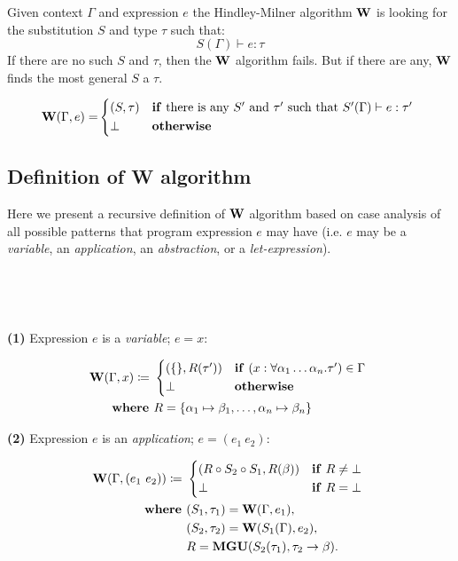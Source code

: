 \documentclass[a4paper,oneside]{memoir}
\begin{document}
Given context $\Gamma$ and expression $e$ the Hindley-Milner algorithm $\operatorname{\textbf{W}}$ 
is looking for the substitution $S$ and type $\tau$ such that: 
$$ S(\Gamma) \vdash e : \tau $$
If there are no such $S$ and $\tau$, then the $\operatorname{\textbf{W}}$ algorithm fails.
But if there are any, $\operatorname{\textbf{W}}$ finds the most general $S$ a $\tau$.


\begin{align*}
\W(\Gamma, e) = &
\begin{cases*}
  (S, \tau) 
  & \textbf{if} there is any $\SPr$ and $\tauPr$ such that $S^\prime(\Gamma) \vdash e : \tauPr$  \\
  \bot & \textbf{otherwise}
\end{cases*}\\
\end{align*}




\subsection{Definition of W algorithm}

Here we present a recursive definition of $\operatorname{\textbf{W}}$ algorithm based on case analysis of all possible patterns that program expression $e$ may have 
(i.e. $e$ may be a \textit{variable}, an \textit{application}, an \textit{abstraction}, or a \textit{let-expression}). 

~



~

\textbf{(1)} Expression $e$ is a \textit{variable}; $e = x$:

\begin{align*}
\W(\Gamma, x) \defi ~ &
\begin{cases*}
  (\{\}, R(\tauPr) ) 
  & \textbf{if} $(x : \forall \alpha_1 \dots \alpha_n.\tauPr) \in \Gamma$  \\
  \bot & \textbf{otherwise}
\end{cases*}\\
\where & R = \{\alpha_1 \mapsto \beta_1, \dots, \alpha_n \mapsto \beta_n\} \\
\end{align*}


\textbf{(2)} Expression $e$ is an \textit{application}; $e = (e_1~e_2)$:

\begin{align*}
\W(\Gamma, (e_1~e_2)) \defi ~ & 
\begin{cases*}
  (R \circ S_2 \circ S_1, R(\beta) ) & \textbf{if} $R \neq \bot$ \\
  \bot & \textbf{if} $R = \bot$
\end{cases*}\\
\where & (S_1, \tau_1) = \W(\Gamma, e_1), \\
       & (S_2, \tau_2) = \W(S_1(\Gamma), e_2), \\
       & R = \Mgu( S_2(\tau_1), \tau_2 \ar \beta ).\\
\end{align*}
\end{document}
